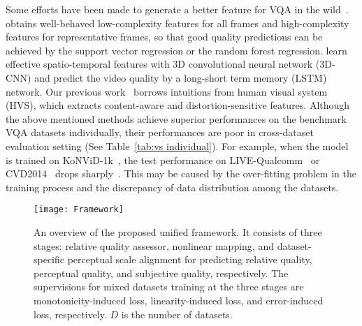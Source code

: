 \documentclass[twocolumn]{svjour3}          \smartqed  \usepackage{graphicx}
\begin{document}
Some efforts have been made to generate a better feature for VQA in the wild~\citep{you2019deep,korhonen2019two,li2019quality}. 
\citet{korhonen2019two} obtains well-behaved low-complexity features for all frames and high-complexity features for representative frames, so that good quality predictions can be achieved by the support vector regression or the random forest regression.
\citet{you2019deep} learn effective spatio-temporal features with 3D convolutional neural network (3D-CNN) and predict the video quality by a long-short term memory (LSTM) network.
Our previous work~\citep{li2019quality} borrows intuitions from human visual system (HVS), which extracts content-aware and distortion-sensitive features.
Although the above mentioned methods achieve superior performances on the benchmark VQA datasets individually, their performances are poor in cross-dataset evaluation setting (See Table~\ref{tab:vs individual}).  
For example, when the model is trained on KoNViD-1k~\citep{hosu2017konstanz}, the test performance on LIVE-Qualcomm~\citep{ghadiyaram2018capture}  or CVD2014~\citep{nuutinen2016cvd2014} drops sharply~\citep{korhonen2019two}.  
This may be caused by the over-fitting problem in the training process and the discrepancy of data distribution among the datasets.

\begin{figure*}[!htb]
\begin{center}
  \texttt{[image: Framework]}\end{center}
  \caption{An overview of the proposed unified framework. It consists of three stages: relative quality assessor, nonlinear mapping, and dataset-specific perceptual scale alignment for predicting relative quality, perceptual quality, and subjective quality, respectively. The supervisions for mixed datasets training at the three stages are monotonicity-induced loss, linearity-induced loss, and error-induced loss, respectively. $D$ is the number of datasets.} 
  \label{fig:framework}
\end{figure*}
\end{document}
